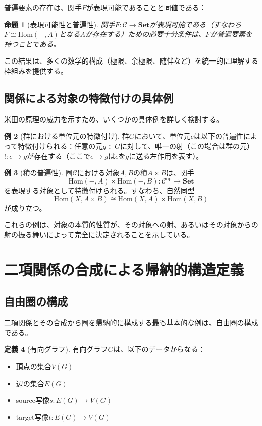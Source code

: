 \documentclass[11pt,a4paper,twocolumn]{ltjsarticle}
\theoremstyle{definition}
\newtheorem{definition}{定義}[section]
\newtheorem{example}[definition]{例}
\theoremstyle{plain}
\newtheorem{proposition}[definition]{命題}
\newcommand{\Set}{\mathbf{Set}}
\newcommand{\Hom}{\mathrm{Hom}}
\newcommand{\op}{\mathrm{op}}
\begin{document}
普遍要素の存在は、関手$F$が表現可能であることと同値である：

\begin{proposition}[表現可能性と普遍性]
関手$F: \mathcal{C} \to \Set$が表現可能である（すなわち$F \cong \Hom(-, A)$となる$A$が存在する）ための必要十分条件は、$F$が普遍要素を持つことである。
\end{proposition}

この結果は、多くの数学的構成（極限、余極限、随伴など）を統一的に理解する枠組みを提供する。

\subsection{関係による対象の特徴付けの具体例}

米田の原理の威力を示すため、いくつかの具体例を詳しく検討する。

\begin{example}[群における単位元の特徴付け]
群$G$において、単位元$e$は以下の普遍性によって特徴付けられる：任意の元$g \in G$に対して、唯一の射（この場合は群の元）$!: e \to g$が存在する（ここで$e \to g$は$e$を$g$に送る左作用を表す）。
\end{example}

\begin{example}[積の普遍性]
圏$\mathcal{C}$における対象$A, B$の積$A \times B$は、関手
\[
\Hom(-, A) \times \Hom(-, B): \mathcal{C}^{\op} \to \Set
\]
を表現する対象として特徴付けられる。すなわち、自然同型
\[
\Hom(X, A \times B) \cong \Hom(X, A) \times \Hom(X, B)
\]
が成り立つ。
\end{example}

これらの例は、対象の本質的性質が、その対象への射、あるいはその対象からの射の振る舞いによって完全に決定されることを示している。

\section{二項関係の合成による帰納的構造定義}

\subsection{自由圏の構成}

二項関係とその合成から圏を帰納的に構成する最も基本的な例は、自由圏の構成である。

\begin{definition}[有向グラフ]
有向グラフ$G$は、以下のデータからなる：
\begin{itemize}
\item 頂点の集合$V(G)$
\item 辺の集合$E(G)$
\item source写像$s: E(G) \to V(G)$
\item target写像$t: E(G) \to V(G)$
\end{itemize}
\end{definition}
\end{document}
